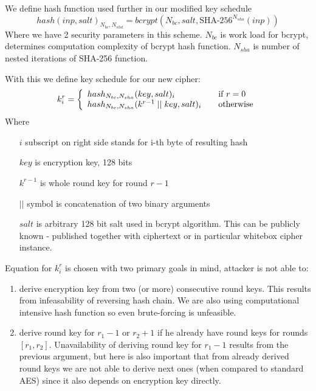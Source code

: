 \documentclass[11pt,oneside,final]{fithesis2}
\begin{document}
    We define hash function used further in our modified key schedule
    \begin{equation}
	hash\left(inp, salt\right)_{N_{bc}, N_{sha}} = bcrypt\left(N_{bc}, salt, \text{SHA-}256^{N_{sha}}\left(inp\right)\right)
    \end{equation}
    Where we have 2 security parameters in this scheme.
    $N_{bc}$ is work load for bcrypt, determines computation complexity of bcrypt hash function. $N_{sha}$ is number of nested iterations of SHA-256 function. 
    
    With this we define key schedule for our new cipher:
    \begin{equation}\label{eq:keySchedule}
    k_i^r = \left\{ 
    \begin{array}{l l} 
	hash_{N_{bc}, N_{sha}}(key, salt)_i                   & \quad \text{if $r=0$}\\
	hash_{N_{bc}, N_{sha}}(k^{r-1} \; || \;  key, salt)_i & \quad \text{otherwise}
    \end{array} \right.
    \end{equation}
    Where
    \begin{itemize}
     \item[$i$] subscript on right side stands for i-th byte of resulting hash
     \item[$key$] is encryption key, 128 bits
     \item[$k^{r-1}$] is whole round key for round $r-1$
     \item[$||$] symbol is concatenation of two binary arguments
     \item[$salt$] is arbitrary 128 bit salt used in bcrypt algorithm. This can be publicly known - published together with ciphertext or 
	in particular whitebox cipher instance.
    \end{itemize}

    Equation for $k_i^r$ is chosen with two primary goals in mind, attacker is not able to:
    \begin{enumerate}
     \item derive encryption key from two (or more) consecutive round keys. This results from infeasability of reversing hash chain. 
	We are also using computational intensive hash function so even brute-forcing is unfeasible.
     \item derive round key for $r_1-1$ or $r_2+1$ if he already have round keys for rounds $[r_1, r_2]$. Unavailability of deriving 
	round key for $r_1-1$ results from the previous argument, but here is also important that from already derived round keys we are not able to derive 	
	next ones (when compared to standard AES) since it also depends on encryption key directly.
    \end{enumerate}
    
\end{document}
